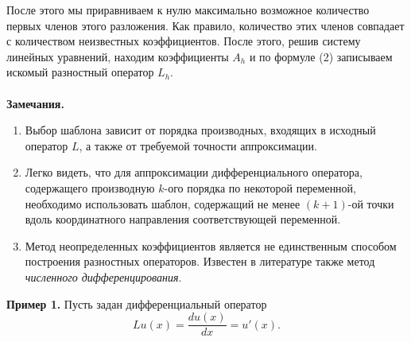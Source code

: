 \documentclass[a4paper, 12pt]{report}
\numberwithin{equation}{section}
\begin{document}
После этого мы приравниваем к нулю максимально возможное количество первых членов этого разложения. Как правило, количество этих членов совпадает с количеством неизвестных коэффициентов. После этого, решив систему линейных уравнений, находим коэффициенты $A_h$ и по формуле (2) записываем искомый разностный оператор $L_h$.
\\\\
\textbf{Замечания.}
\begin{enumerate}
\item Выбор шаблона зависит от порядка производных, входящих в исходный оператор $L$, а также от требуемой точности аппроксимации.
\item Легко видеть, что для аппроксимации дифференциального оператора, содержащего производную $k$-ого порядка по некоторой переменной, необходимо использовать шаблон, содержащий не менее $(k+1)$-ой точки вдоль координатного направления соответствующей переменной.
\item Метод неопределенных коэффициентов является не единственным способом построения разностных операторов. Известен в литературе также метод \textit{численного дифференцирования}.
\end{enumerate}
\textbf{Пример 1.}
Пусть задан дифференциальный оператор $$Lu(x) = \dfrac{d u(x)}{dx} = u'(x).$$
\end{document}
